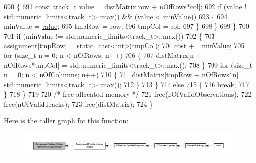 \begin{DoxyCode}
690             \{
691                 \textcolor{keyword}{const} \mbox{\hyperlink{defines_8h_a7ce9c8817b42ab418e61756f579549ab}{track\_t}} \mbox{\hyperlink{struct_g_m_l__token_a50b20988e3fe419332313e8d9e02c775}{value}} = distMatrix[row + nOfRows*col];
692                 \textcolor{keywordflow}{if} (\mbox{\hyperlink{struct_g_m_l__token_a50b20988e3fe419332313e8d9e02c775}{value}} != std::numeric\_limits<track\_t>::max() && (\mbox{\hyperlink{struct_g_m_l__token_a50b20988e3fe419332313e8d9e02c775}{value}} < minValue))
693                 \{
694                     minValue = \mbox{\hyperlink{struct_g_m_l__token_a50b20988e3fe419332313e8d9e02c775}{value}};
695                     tmpRow = row;
696                     tmpCol = col;
697                 \}
698             \}
699         \}
700 
701         \textcolor{keywordflow}{if} (minValue != std::numeric\_limits<track\_t>::max())
702         \{
703             assignment[tmpRow] = \textcolor{keyword}{static\_cast<}\textcolor{keywordtype}{int}\textcolor{keyword}{>}(tmpCol);
704             cost += minValue;
705             \textcolor{keywordflow}{for} (\textcolor{keywordtype}{size\_t} n = 0; n < nOfRows; n++)
706             \{
707                 distMatrix[n + nOfRows*tmpCol] = std::numeric\_limits<track\_t>::max();
708             \}
709             \textcolor{keywordflow}{for} (\textcolor{keywordtype}{size\_t} n = 0; n < nOfColumns; n++)
710             \{
711                 distMatrix[tmpRow + nOfRows*n] = std::numeric\_limits<track\_t>::max();
712             \}
713         \}
714         \textcolor{keywordflow}{else}
715         \{
716             \textcolor{keywordflow}{break};
717         \}
718     \}
719 
720     \textcolor{comment}{/* free allocated memory */}
721     free(nOfValidObservations);
722     free(nOfValidTracks);
723     free(distMatrix);
724 \}
\end{DoxyCode}
Here is the caller graph for this function\+:\nopagebreak
\begin{figure}[H]
\begin{center}
\leavevmode
\includegraphics[width=350pt]{class_assignment_problem_solver_ae8fddfafc7387f3597493f02e8366883_icgraph}
\end{center}
\end{figure}
\mbox{\label{class_assignment_problem_solver_a31277dc88cb22e07db1e52b6fe88f84f}} 

